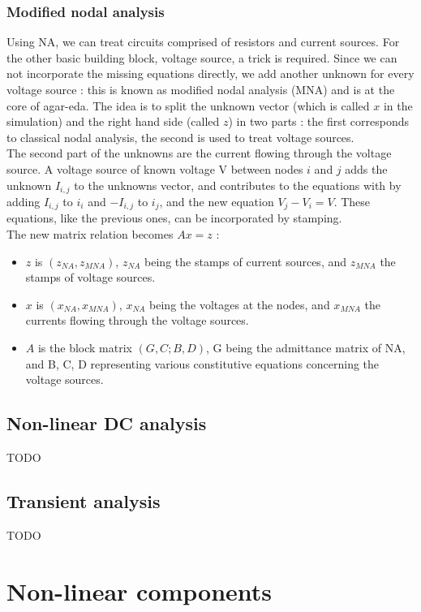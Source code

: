 \documentclass{article}
\begin{document}
\subsubsection{Modified nodal analysis}
Using NA, we can treat circuits comprised of resistors and current sources. For the other basic building block, voltage source, a trick is required. Since we can not incorporate the missing equations directly, we add another unknown for every voltage source : this is known as modified nodal analysis (MNA) and is at the core of agar-eda. The idea is to split the unknown vector (which is called $x$ in the simulation) and the right hand side (called $z$) in two parts : the first corresponds to classical nodal analysis, the second is used to treat voltage sources.\\
The second part of the unknowns are the current flowing through the voltage source. A voltage source of known voltage V between nodes $i$ and $j$ adds the unknown $I_{i,j}$ to the unknowns vector, and contributes to the equations with by adding $I_{i,j}$ to $i_i$ and $-I_{i,j}$ to $i_j$, and the new equation $V_j - V_i = V$. These equations, like the previous ones, can be incorporated by stamping.\\
The new matrix relation becomes $Ax = z$ :\\
\begin{itemize}
\item $z$ is $(z_{NA}, z_{MNA})$, $z_{NA}$ being the stamps of current sources, and $z_{MNA}$ the stamps of voltage sources. 
\item $x$ is $(x_{NA}, x_{MNA})$, $x_{NA}$ being the voltages at the nodes, and $x_{MNA}$ the currents flowing through the voltage sources.
\item $A$ is the block matrix $(G,C;B,D)$, G being the admittance matrix of NA, and B, C, D representing various constitutive equations concerning the voltage sources.
\end{itemize}
\subsection{Non-linear DC analysis}
TODO
\subsection{Transient analysis}
TODO


\section{Non-linear components}
\end{document}
